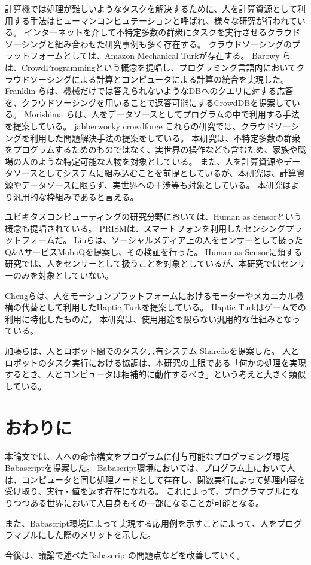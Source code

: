 計算機では処理が難しいようなタスクを解決するために、人を計算資源として利用する手法はヒューマンコンピュテーション\cite{HumanComputation}と呼ばれ、様々な研究が行われている。
インターネットを介して不特定多数の群衆にタスクを実行させるクラウドソーシングと組み合わせた研究事例も多く存在する。
クラウドソーシングのプラットフォームとしては、Amazon Mechanical
Turk\cite{mechanicalturk}が存在する。 Barowy
らは、CrowdProgrammingという概念を提唱し、プログラミング言語内においてクラウドソーシングによる計算とコンピュータによる計算の統合を実現した\cite{automan}。
Franklin
らは、機械だけでは答えられないようなDBへのクエリに対する応答を、クラウドソーシングを用いることで返答可能にするCrowdDBを提案している\cite{crowddb}。
Morishima
らは、人をデータソースとしてプログラムの中で利用する手法を提案している\cite{cylog}。
jabberwocky crowdforge
これらの研究では、クラウドソーシングを利用した問題解決手法の提案をしている。
本研究は、不特定多数の群衆をプログラムするためのものではなく、実世界の操作なども含むため、家族や職場の人のような特定可能な人物を対象としている。
また、人を計算資源やデータソースとしてシステムに組み込むことを前提としているが、本研究は、計算資源やデータソースに限らず、実世界への干渉等も対象としている。
本研究はより汎用的な枠組みであると言える。

ユビキタスコンピューティングの研究分野においては、Human as
Sensorという概念も提唱されている。
PRISMは、スマートフォンを利用したセンシングプラットフォームだ\cite{prism}。
Liuらは、ソーシャルメディア上の人をセンサーとして扱ったQ\&AサービスMoboQを提案し、その検証を行った。
Human as
Sensorに類する研究では、人をセンサーとして扱うことを対象としているが、本研究ではセンサーのみを対象としていない。

Chengらは、人をモーションプラットフォームにおけるモーターやメカニカル機構の代替として利用したHaptic
Turkを提案している\cite{hapticturk}。 Haptic
Turkはゲームでの利用に特化したものだ。
本研究は、使用用途を限らない汎用的な仕組みとなっている。

加藤らは、人とロボット間でのタスク共有システム
Sharedoを提案した\cite{sharedo}。
人とロボットのタスク実行における協調は、本研究の主眼である「何かの処理を実現するとき、人とコンピュータは相補的に動作するべき」という考えと大きく類似している。

\section{おわりに}\label{ux304aux308fux308aux306b}

本論文では、人への命令構文をプログラムに付与可能なプログラミング環境Babascriptを提案した。
Babascript環境においては、プログラム上において人は、コンピュータと同じ処理ノードとして存在し、関数実行によって処理内容を受け取り、実行・値を返す存在になれる。
これによって、プログラマブルになりつつある世界において人自身もその一部になることが可能となる。

また、Babascript環境によって実現する応用例を示すことによって、人をプログラマブルにした際のメリットを示した。

今後は、議論で述べたBabascriptの問題点などを改善していく。
